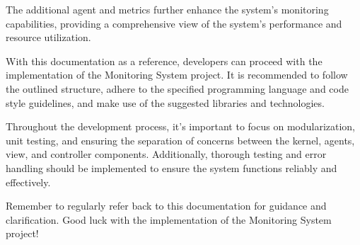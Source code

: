 \documentclass[12pt, letterpaper]{article}
\begin{document}
The additional agent and metrics further enhance the system's monitoring capabilities, providing a comprehensive view of the system's performance and resource utilization.

With this documentation as a reference, developers can proceed with the implementation of the Monitoring System project. It is recommended to follow the outlined structure, adhere to the specified programming language and code style guidelines, and make use of the suggested libraries and technologies.

Throughout the development process, it's important to focus on modularization, unit testing, and ensuring the separation of concerns between the kernel, agents, view, and controller components. Additionally, thorough testing and error handling should be implemented to ensure the system functions reliably and effectively.

Remember to regularly refer back to this documentation for guidance and clarification. Good luck with the implementation of the Monitoring System project!
\end{document}
